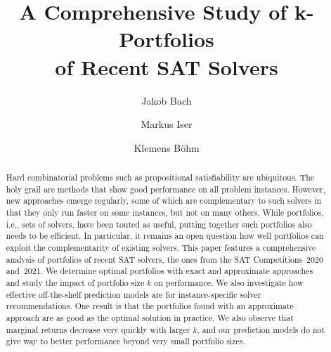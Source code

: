 \documentclass[runningheads]{llncs}
\begin{document}
\title{A Comprehensive Study of k-Portfolios\\ of Recent SAT Solvers}


\author{
	Jakob Bach \and %
	Markus Iser \and%
	Klemens Böhm%
}



\maketitle

\begin{abstract}
Hard combinatorial problems such as propositional satisfiability are ubiquitous. 
The holy grail are methods that show good performance on all problem instances. 
However, new approaches emerge regularly, some of which are complementary to such solvers in that they only run faster on some instances, but not on many others. 
While portfolios, i.e., sets of solvers, have been touted as useful, putting together such portfolios also needs to be efficient. 
In particular, it remains an open question how well portfolios can exploit the complementarity of existing solvers. 
This paper features a comprehensive analysis of portfolios of recent SAT solvers, the ones from the SAT Competitions~2020 and~2021. 
We determine optimal portfolios with exact and approximate approaches and study the impact of portfolio size $k$ on performance. 
We also investigate how effective off-the-shelf prediction models are for instance-specific solver recommendations.
One result is that the portfolios found with an approximate approach are as good as the optimal solution in practice. 
We also observe that marginal returns decrease very quickly with larger $k$, and our prediction models do not give way to better performance beyond very small portfolio sizes. 

\end{abstract}
\end{document}
